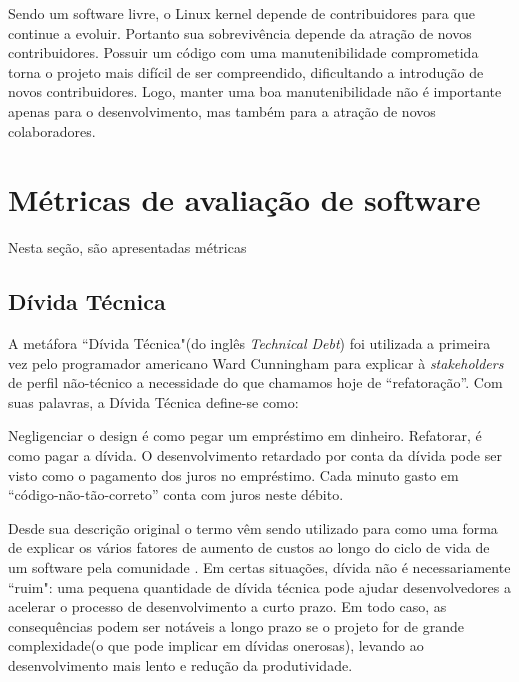 Sendo um software livre, o Linux kernel depende de contribuidores
para que continue a evoluir. Portanto sua sobrevivência depende da
atração de novos contribuidores\cite{crowston2012free}. Possuir um
código com uma manutenibilidade comprometida torna o projeto mais
difícil de ser compreendido, dificultando a introdução de novos contribuidores.
Logo, manter uma boa manutenibilidade não é importante apenas para
o desenvolvimento, mas também para a atração de novos colaboradores.


\section{Métricas de avaliação de software} \label {sec:softwareMetrics}
Nesta seção, são apresentadas métricas 
\subsection{Dívida Técnica}
A metáfora ``Dívida Técnica"(do inglês \textit{Technical Debt}) foi utilizada a primeira vez pelo programador americano Ward Cunningham para explicar à \textit{stakeholders} de perfil não-técnico a necessidade do que chamamos hoje de ``refatoração''\cite{cunningham1993wycash}. Com suas palavras, a Dívida Técnica define-se como: 
\begin{quoteAbnt} Negligenciar o design é como pegar um empréstimo em dinheiro. Refatorar, é como pagar a dívida. O desenvolvimento retardado por conta da dívida pode ser visto como o pagamento dos juros no empréstimo. Cada minuto gasto em ``código-não-tão-correto'' conta com juros neste débito.\end{quoteAbnt}

Desde sua descrição original o termo vêm sendo utilizado para como uma forma de explicar os vários fatores de aumento de custos ao longo do ciclo de vida de um software pela comunidade \cite{brown2010managing}.
Em certas situações, dívida não é necessariamente ``ruim": uma pequena quantidade de dívida técnica pode ajudar desenvolvedores a acelerar o processo de desenvolvimento a curto prazo.
Em todo caso, as consequências podem ser notáveis a longo prazo se o projeto for de grande complexidade(o que pode implicar em dívidas onerosas), levando ao desenvolvimento mais lento e redução da produtividade.

